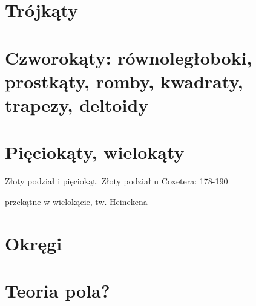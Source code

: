 
\section{Trójkąty}


\section{Czworokąty: równoległoboki, prostkąty, romby, kwadraty, trapezy, deltoidy}


\section{Pięciokąty, wielokąty}
Złoty podział i pięciokąt.
Złoty podział u Coxetera: 178-190


%
przekątne w wielokącie, tw. Heinekena %

\section{Okręgi}


\section{Teoria pola?}

